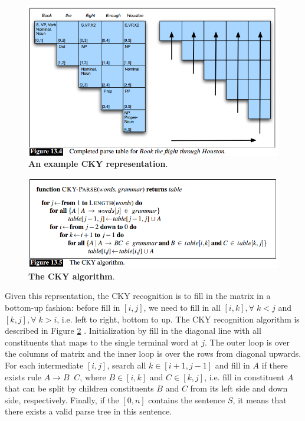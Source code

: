 \documentclass[11pt]{article}
\begin{document}
\begin{figure}
\begin{minipage}[t]{1\linewidth}
  \centering
  \centerline{\includegraphics[scale = 0.5]{example_repr_cky.png}}
\end{minipage}
\caption{\footnotesize{\textbf{An example CKY representation}.}}
\label{fig: cky_example}
\end{figure}
\begin{figure}
\begin{minipage}[t]{1\linewidth}
  \centering
  \centerline{\includegraphics[scale = 0.5]{cky_alg.png}}
\end{minipage}
\caption{\footnotesize{\textbf{The CKY algorithm}.}}
\label{fig: cky}
\end{figure}

Given this reprsentation, the CKY recognition is to fill in the matrix in a bottom-up fashion: before fill in $[i,j]$, we need to fill in all $[i,k], \forall\; k<j$ and $[k,j],\forall\; k>i$, i.e. left to right, bottom to up. The CKY recognition algorithm is described in Figure \ref{fig: cky} \citep{jurafsky2014speech}. Initialization by fill in the diagonal line with all constituents that maps to the single terminal word at $j$. The outer loop is over the columns of matrix and the inner loop is over the rows from diagonal upwards. For each intermediate $[i,j]$, search all $k \in [i+1,j-1]$ and fill in $A$ if there exists rule $A \rightarrow B\;\;C$, where $B \in [i,k]$ and $C \in [k,j]$, i.e. fill in constituent $A$ that can be split by children constituents $B$ and $C$ from its left side and down side, respectively. Finally, if the $[0,n]$ contains the sentence $S$, it means that there exists a valid parse tree in this sentence. 
\end{document}
